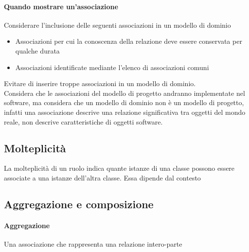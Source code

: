 \paragraph*{Quando mostrare un'associazione} 
Considerare l'inclusione delle seguenti associazioni in un modello di dominio
\begin{itemize}
    \item Associazioni per cui la conoscenza della relazione deve essere conservata
    per qualche durata
    \item Associazioni identificate mediante l'elenco di associazioni comuni
\end{itemize}
Evitare di inserire troppe associazioni in un modello di dominio.
\\ Considera che le associazioni del modello di progetto andranno implementate
nel software, ma considera che un modello di dominio non è un modello di progetto, 
infatti una associazione descrive una relazione significativa tra oggetti del mondo
reale, non descrive caratteristiche di oggetti software.
\subsection*{Molteplicità}
La molteplicità di un ruolo indica quante istanze di una classe possono
essere associate a una istanze dell'altra classe. Essa dipende dal contesto
\subsection*{Aggregazione e composizione}
\paragraph*{Aggregazione} Una associazione che rappresenta una relazione intero-parte
